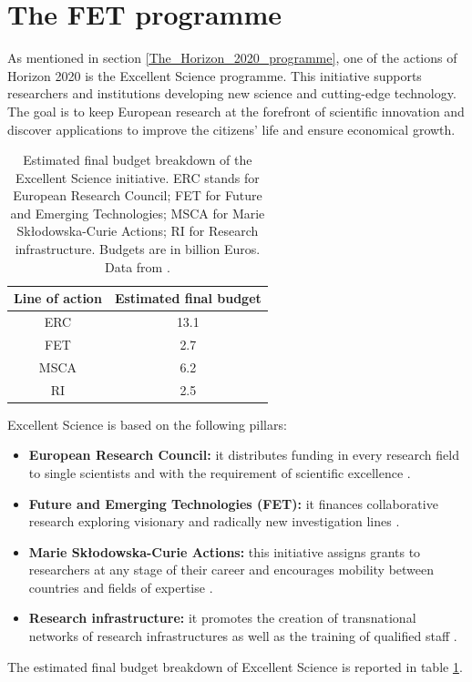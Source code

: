 \section{The FET programme} \label{The_FET_programme}
As mentioned in section \ref{The_Horizon_2020_programme}, one of the actions of Horizon 2020 is the Excellent Science programme. This initiative supports researchers and institutions developing new science and cutting-edge technology. The goal is to keep European research at the forefront of scientific innovation and discover applications to improve the citizens' life and ensure economical growth.  

\begin{table}[t]
 \begin{center}
  \begin{tabular}{cc}
   \hline 
   \hline
   Line of action & Estimated final budget \\ 
   \hline
   \hline
   ERC & 13.1 \\
   FET & 2.7 \\
   MSCA & 6.2 \\
   RI & 2.5 \\
   \hline
   \hline
  \end{tabular}
 \end{center} 
 \caption{Estimated final budget breakdown of the Excellent Science initiative. ERC stands for European Research Council; FET for Future and Emerging Technologies; MSCA for Marie Sk\l{}odowska-Curie Actions; RI for Research infrastructure. Budgets are in billion Euros. Data from \cite{H2020Budget}.}
\label{FET_budget_breakdown} 
\end{table}

Excellent Science is based on the following pillars: 

\begin{itemize}
 \item \textbf{European Research Council:} it distributes funding in every research field to single scientists and with the requirement of scientific excellence \cite{ERC}.  
 \item \textbf{Future and Emerging Technologies (FET):} it finances collaborative research exploring visionary and radically new investigation lines \cite{FET}. 
 \item \textbf{Marie Sk\l{}odowska-Curie Actions:} this initiative assigns grants to researchers at any stage of their career and encourages mobility between countries and fields of expertise \cite{MSCA}. 
 \item \textbf{Research infrastructure:} it promotes the creation of transnational networks of research infrastructures as well as the training of qualified staff \cite{ResearchInfrastructure}. 
\end{itemize}
The estimated final budget breakdown of Excellent Science is reported in table \ref{FET_budget_breakdown}.


